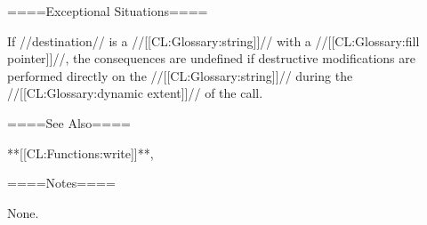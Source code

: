 ====Exceptional Situations====

If //destination// is a //[[CL:Glossary:string]]// with a //[[CL:Glossary:fill pointer]]//, the consequences are undefined if destructive modifications are performed directly on the //[[CL:Glossary:string]]// during the //[[CL:Glossary:dynamic extent]]// of the call.

====See Also====

**[[CL:Functions:write]]**, {\secref\ImplementationDefinedScripts}

====Notes====

None.

 
